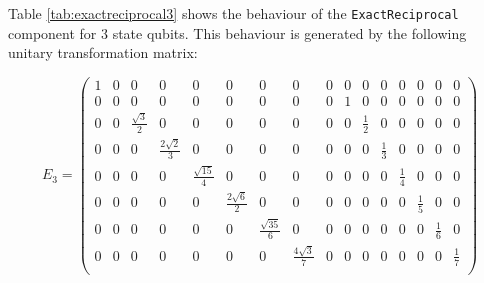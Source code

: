 \documentclass[12pt]{extarticle}
\begin{document}
Table \ref{tab:exactreciprocal3} shows the behaviour of the \texttt{ExactReciprocal} component for 3 state qubits.
This behaviour is generated by the following unitary transformation matrix:

\setcounter{MaxMatrixCols}{20}
\begin{small}
\[
E_3 = \begin{pmatrix}
1 &  0 & 0                   & 0                   & 0                   & 0                   & 0                   & 0                   & 0 & 0  & 0                  & 0                   & 0                   & 0                   & 0                   & 0 \\
0 &  0 & 0                   & 0                   & 0                   & 0                   & 0                   & 0                   & 0 & 1  & 0                  & 0                   & 0                   & 0                   & 0                   & 0 \\
0 &  0 & \frac{\sqrt{3}}{2}  & 0                   & 0                   & 0                   & 0                   & 0                   & 0 & 0  & \frac{1}{2}        & 0                   & 0                   & 0                   & 0                   & 0 \\
0 &  0 & 0                   & \frac{2\sqrt{2}}{3} & 0                   & 0                   & 0                   & 0                   & 0 & 0  & 0                  & \frac{1}{3}         & 0                   & 0                   & 0                   & 0 \\
0 &  0 & 0                   & 0                   & \frac{\sqrt{15}}{4} & 0                   & 0                   & 0                   & 0 & 0  & 0                  & 0                   & \frac{1}{4}         & 0                   & 0                   & 0 \\
0 &  0 & 0                   & 0                   & 0                   & \frac{2\sqrt{6}}{2} & 0                   & 0                   & 0 & 0  & 0                  & 0                   & 0                   & \frac{1}{5}         & 0                   & 0 \\
0 &  0 & 0                   & 0                   & 0                   & 0                   & \frac{\sqrt{35}}{6} & 0                   & 0 & 0  & 0                  & 0                   & 0                   & 0                   & \frac{1}{6}         & 0 \\
0 &  0 & 0                   & 0                   & 0                   & 0                   & 0                   & \frac{4\sqrt{3}}{7} & 0 & 0  & 0                  & 0                   & 0                   & 0                   & 0                   & \frac{1}{7} \\

\end{pmatrix}\]
\end{small}
\end{document}
